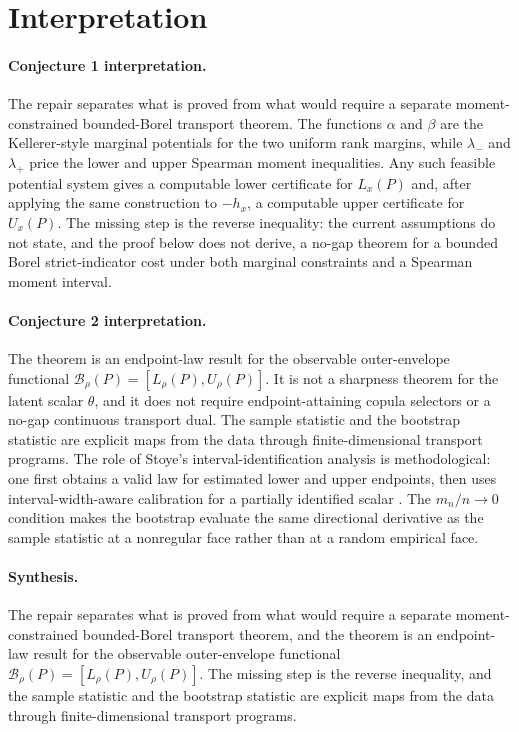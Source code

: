 \documentclass[11pt]{article}
\theoremstyle{definition}
\theoremstyle{plain}
\theoremstyle{remark}
\begin{document}
\section{Interpretation}
\paragraph{Conjecture 1 interpretation.}
The repair separates what is proved from what would require a separate moment-constrained bounded-Borel transport theorem.  The functions \(\alpha\) and \(\beta\) are the Kellerer-style marginal potentials for the two uniform rank margins, while \(\lambda_-\) and \(\lambda_+\) price the lower and upper Spearman moment inequalities.  Any such feasible potential system gives a computable lower certificate for \(L_x(P)\) and, after applying the same construction to \(-h_x\), a computable upper certificate for \(U_x(P)\).  The missing step is the reverse inequality: the current assumptions do not state, and the proof below does not derive, a no-gap theorem for a bounded Borel strict-indicator cost under both marginal constraints and a Spearman moment interval.

\paragraph{Conjecture 2 interpretation.}
The theorem is an endpoint-law result for the observable outer-envelope functional \(\mathcal B_\rho(P)=[L_\rho(P),U_\rho(P)]\).  It is not a sharpness theorem for the latent scalar \(\theta\), and it does not require endpoint-attaining copula selectors or a no-gap continuous transport dual.  The sample statistic and the bootstrap statistic are explicit maps from the data through finite-dimensional transport programs.  The role of Stoye's interval-identification analysis is methodological: one first obtains a valid law for estimated lower and upper endpoints, then uses interval-width-aware calibration for a partially identified scalar \cite{Stoye2009MoreCI}.  The \(m_n/n\to0\) condition makes the bootstrap evaluate the same directional derivative as the sample statistic at a nonregular face rather than at a random empirical face.

\paragraph{Synthesis.}
The repair separates what is proved from what would require a separate moment-constrained bounded-Borel transport theorem, and the theorem is an endpoint-law result for the observable outer-envelope functional \(\mathcal B_\rho(P)=[L_\rho(P),U_\rho(P)]\).  The missing step is the reverse inequality, and the sample statistic and the bootstrap statistic are explicit maps from the data through finite-dimensional transport programs.
\end{document}
